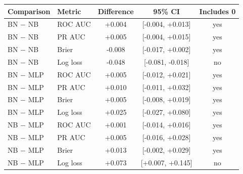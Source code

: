 \begin{tabular}{llccc}
\toprule
Comparison & Metric & Difference & 95\% CI & Includes 0 \\
\midrule
BN $-$ NB & ROC AUC & +0.004 & [-0.004, +0.013] & yes \\
BN $-$ NB & PR AUC & +0.005 & [-0.004, +0.015] & yes \\
BN $-$ NB & Brier & -0.008 & [-0.017, +0.002] & yes \\
BN $-$ NB & Log loss & -0.048 & [-0.081, -0.018] & no \\
BN $-$ MLP & ROC AUC & +0.005 & [-0.012, +0.021] & yes \\
BN $-$ MLP & PR AUC & +0.010 & [-0.011, +0.032] & yes \\
BN $-$ MLP & Brier & +0.005 & [-0.008, +0.019] & yes \\
BN $-$ MLP & Log loss & +0.025 & [-0.027, +0.080] & yes \\
NB $-$ MLP & ROC AUC & +0.001 & [-0.014, +0.016] & yes \\
NB $-$ MLP & PR AUC & +0.005 & [-0.016, +0.028] & yes \\
NB $-$ MLP & Brier & +0.013 & [-0.002, +0.029] & yes \\
NB $-$ MLP & Log loss & +0.073 & [+0.007, +0.145] & no \\
\bottomrule
\end{tabular}
